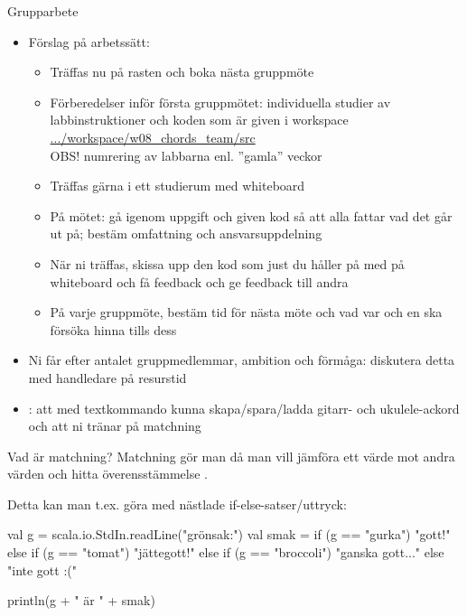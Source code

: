 \begin{Slide}{Grupparbete}\SlideFontSmall
\begin{itemize}
\item Förslag på arbetssätt:
\begin{itemize}\SlideFontSmall
\item Träffas nu på rasten och boka nästa gruppmöte
\item Förberedelser inför första gruppmötet: individuella studier av labbinstruktioner och koden som är given i workspace \\
\href{https://github.com/lunduniversity/introprog/tree/master/workspace/w08_chords_team/src}{.../workspace/w08\_chords\_team/src} \\
OBS! numrering av labbarna enl. ''gamla'' veckor
\item Träffas gärna i ett studierum med whiteboard
\item På mötet: gå igenom uppgift och given kod så att alla fattar vad det går ut på; bestäm omfattning och ansvarsuppdelning
\item När ni träffas, skissa upp den kod som just du håller på med på whiteboard och få feedback och ge feedback till andra
\item På varje gruppmöte, bestäm tid för nästa möte och vad var och en ska försöka hinna tills dess
\end{itemize}


\item Ni får  efter antalet gruppmedlemmar, ambition och förmåga: diskutera detta med handledare på resurstid

\item {}: att med textkommando kunna skapa/spara/ladda gitarr- och ukulele-ackord och att ni tränar på matchning

\end{itemize}
\end{Slide}


\begin{Slide}{Vad är matchning?}
Matchning gör man då man vill jämföra ett värde mot andra värden och hitta överensstämmelse .

\pause

\vspace{1em}Detta kan man t.ex. göra med nästlade if-else-satser/uttryck:

\begin{Code}
val g = scala.io.StdIn.readLine("grönsak:")
val smak = 
  if (g == "gurka") "gott!"
  else if (g == "tomat") "jättegott!"
  else if (g == "broccoli") "ganska gott..."
  else "inte gott :("

println(g + " är " + smak)
\end{Code}
\end{Slide}
\fi

